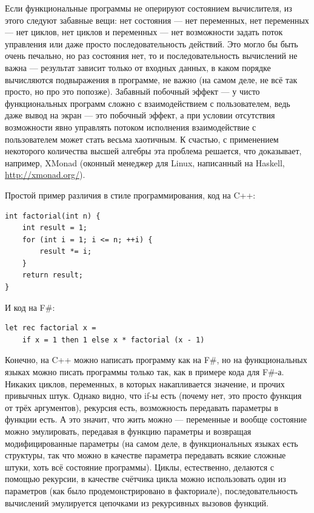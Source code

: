 \documentclass[a5paper]{article}
\begin{document}
Если функциональные программы не оперируют состоянием вычислителя, из этого следуют забавные вещи: нет состояния --- нет переменных, нет переменных --- нет циклов, нет циклов и переменных --- нет возможности задать поток управления или даже просто последовательность действий. Это могло бы быть очень печально, но раз состояния нет, то и последовательность вычислений не важна --- результат зависит только от входных данных, в каком порядке вычисляются подвыражения в программе, не важно (на самом деле, не всё так просто, но про это попозже). Забавный побочный эффект --- у чисто функциональных программ сложно с взаимодействием с пользователем, ведь даже вывод на экран --- это побочный эффект, а при условии отсутствия возможности явно управлять потоком исполнения взаимодействие с пользователем может стать весьма хаотичным. К счастью, с применением некоторого количества высшей алгебры эта проблема решается, что доказывает, например, XMonad (оконный менеджер для Linux, написанный на Haskell, \url{http://xmonad.org/}).

Простой пример различия в стиле программирования, код на C++:
\begin{verbatim}
int factorial(int n) {
    int result = 1;
    for (int i = 1; i <= n; ++i) {
        result *= i;
    }
    return result;
}
\end{verbatim}

И код на F\#:
\begin{verbatim}
let rec factorial x =
    if x = 1 then 1 else x * factorial (x - 1)
\end{verbatim}

Конечно, на C++ можно написать программу как на F\#, но на функциональных языках можно писать программы только так, как в примере кода для F\#-а. Никаких циклов, переменных, в которых накапливается значение, и прочих привычных штук. Однако видно, что if-ы есть (почему нет, это просто функция от трёх аргументов), рекурсия есть, возможность передавать параметры в функции есть. А это значит, что жить можно --- переменные и вообще состояние можно эмулировать, передавая в функцию параметры и возвращая модифицированные параметры (на самом деле, в функциональных языках есть структуры, так что можно в качестве параметра передавать всякие сложные штуки, хоть всё состояние программы). Циклы, естественно, делаются с помощью рекурсии, в качестве счётчика цикла можно использовать один из параметров (как было продемонстрировано в факториале), последовательность вычислений эмулируется цепочками из рекурсивных вызовов функций.
\end{document}
